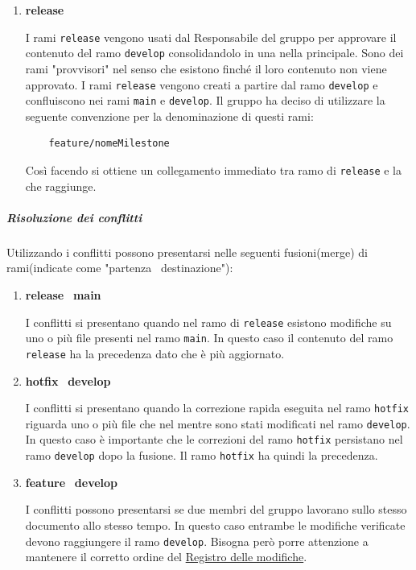 \begin{enumerate}
I rami \texttt{hotfix} vengono usati per eseguire modifiche rapide e di dimensioni ridotte.
Queste modifiche non influenzano quindi le versioni dei documenti.
Questi rami sono "provvisori" nel senso che vengono eliminati dopo che le loro modifiche sono state allineate ai rami \texttt{main} e \texttt{develop}.


\item \textbf{release}

I rami \texttt{release} vengono usati dal Responsabile del gruppo per approvare il contenuto del ramo \texttt{develop} consolidandolo in una  nella  principale.
Sono dei rami "provvisori" nel senso che esistono finché il loro contenuto non viene approvato.
I rami \texttt{release} vengono creati a partire dal ramo \texttt{develop} e confluiscono nei rami \texttt{main} e \texttt{develop}.
Il gruppo ha deciso di utilizzare la seguente convenzione per la denominazione di questi rami:
\begin{lstlisting}
    feature/nomeMilestone
\end{lstlisting}
Così facendo si ottiene un collegamento immediato tra ramo di \texttt{release} e la  che raggiunge.
\end{enumerate}

\subparagraph{Risoluzione dei conflitti}
\label{subpar:risoluzione_dei_conflitti}
Utilizzando  i conflitti possono presentarsi nelle seguenti fusioni(merge) di rami(indicate come "partenza \textrightarrow\ destinazione"):
\begin{enumerate}
    \item \textbf{release} \textrightarrow\ \textbf{main}
    
    I conflitti si presentano quando nel ramo di \texttt{release} esistono modifiche su uno o più file presenti nel ramo \texttt{main}.
    In questo caso il contenuto del ramo \texttt{release} ha la precedenza dato che è più aggiornato.
    
    \item \textbf{hotfix} \textrightarrow\ \textbf{develop}
    
    I conflitti si presentano quando la correzione rapida eseguita nel ramo \texttt{hotfix} riguarda uno o più file che nel mentre sono stati modificati nel ramo \texttt{develop}.
    In questo caso è importante che le correzioni del ramo \texttt{hotfix} persistano nel ramo \texttt{develop} dopo la fusione.
    Il ramo \texttt{hotfix} ha quindi la precedenza.   


    \item \textbf{feature} \textrightarrow\ \textbf{develop}
   
    I conflitti possono presentarsi se due membri del gruppo lavorano sullo stesso documento allo stesso tempo.
    In questo caso entrambe le modifiche verificate devono raggiungere il ramo \texttt{develop}.
    Bisogna però porre attenzione a mantenere il corretto ordine del \hyperref[par:registro_delle_modifiche]{Registro delle modifiche}.
\end{enumerate}


